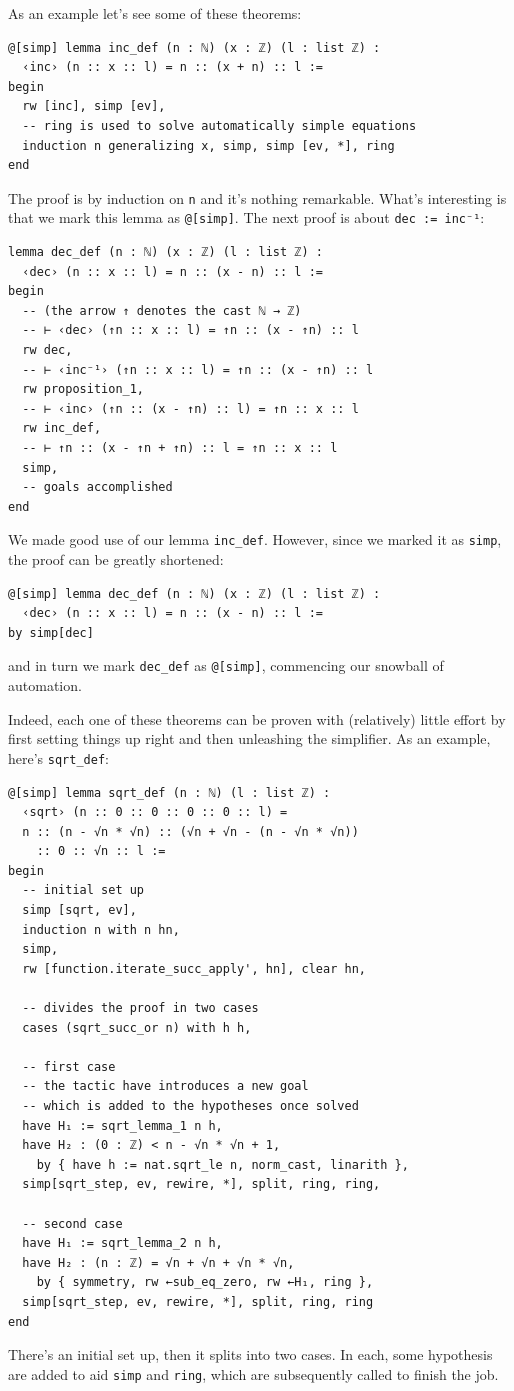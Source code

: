 \documentclass{book}
\theoremstyle{definition}
\theoremstyle{remark}
\theoremstyle{plain}
\begin{document}
As an example let's see some of these theorems:
\begin{lstlisting}
@[simp] lemma inc_def (n : ℕ) (x : ℤ) (l : list ℤ) :
  ‹inc› (n :: x :: l) = n :: (x + n) :: l :=
begin
  rw [inc], simp [ev],
  -- ring is used to solve automatically simple equations 
  induction n generalizing x, simp, simp [ev, *], ring
end
\end{lstlisting}
The proof is by induction on \lstinline{n} and it's nothing remarkable.
What's interesting is that we mark this lemma as \lstinline{@[simp]}.
The next proof is about \lstinline{dec := inc⁻¹}:
\begin{lstlisting}
lemma dec_def (n : ℕ) (x : ℤ) (l : list ℤ) :
  ‹dec› (n :: x :: l) = n :: (x - n) :: l :=
begin
  -- (the arrow ↑ denotes the cast ℕ → ℤ)
  -- ⊢ ‹dec› (↑n :: x :: l) = ↑n :: (x - ↑n) :: l
  rw dec,
  -- ⊢ ‹inc⁻¹› (↑n :: x :: l) = ↑n :: (x - ↑n) :: l
  rw proposition_1,
  -- ⊢ ‹inc› (↑n :: (x - ↑n) :: l) = ↑n :: x :: l
  rw inc_def,
  -- ⊢ ↑n :: (x - ↑n + ↑n) :: l = ↑n :: x :: l
  simp,
  -- goals accomplished
end
\end{lstlisting}
We made good use of our lemma \lstinline{inc_def}.
However, since we marked it as \lstinline{simp}, the proof can be greatly shortened:
\begin{lstlisting}
@[simp] lemma dec_def (n : ℕ) (x : ℤ) (l : list ℤ) :
  ‹dec› (n :: x :: l) = n :: (x - n) :: l :=
by simp[dec]
\end{lstlisting}
and in turn we mark \lstinline{dec_def} as \lstinline{@[simp]},
commencing our snowball of automation.

Indeed, each one of these theorems can be proven with (relatively) little effort
by first setting things up right and then unleashing the simplifier.
As an example, here's \lstinline{sqrt_def}:
\begin{lstlisting}
@[simp] lemma sqrt_def (n : ℕ) (l : list ℤ) :
  ‹sqrt› (n :: 0 :: 0 :: 0 :: 0 :: l) =
  n :: (n - √n * √n) :: (√n + √n - (n - √n * √n))
    :: 0 :: √n :: l :=
begin
  -- initial set up
  simp [sqrt, ev],
  induction n with n hn,
  simp,
  rw [function.iterate_succ_apply', hn], clear hn,

  -- divides the proof in two cases
  cases (sqrt_succ_or n) with h h,

  -- first case
  -- the tactic have introduces a new goal
  -- which is added to the hypotheses once solved
  have H₁ := sqrt_lemma_1 n h,
  have H₂ : (0 : ℤ) < n - √n * √n + 1,
    by { have h := nat.sqrt_le n, norm_cast, linarith },
  simp[sqrt_step, ev, rewire, *], split, ring, ring,

  -- second case
  have H₁ := sqrt_lemma_2 n h,
  have H₂ : (n : ℤ) = √n + √n + √n * √n,
    by { symmetry, rw ←sub_eq_zero, rw ←H₁, ring },
  simp[sqrt_step, ev, rewire, *], split, ring, ring
end
\end{lstlisting}
There's an initial set up, then it splits into two cases.
In each, some hypothesis are added to aid \lstinline{simp} and \lstinline{ring},
which are subsequently called to finish the job.
\end{document}
